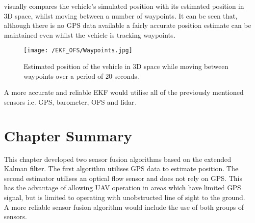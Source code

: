  visually compares the vehicle's simulated position with its estimated position in 3D space, whilst moving between a number of waypoints. It can be seen that, although there is no GPS data available a fairly accurate position estimate can be maintained even whilst the vehicle is tracking waypoints.
\begin{figure}[htb]
\begin{center}
	\texttt{[image: /EKF\_OFS/Waypoints.jpg]}\\
	\end{center}
	\caption{Estimated position of the vehicle in 3D space while moving between waypoints over a period of 20 seconds.}%
	\label{fig:EKF_OFS_3D}%
\end{figure}


A more accurate and reliable EKF would utilise all of the previously mentioned sensors i.e. GPS, barometer, OFS and lidar. 

\FloatBarrier

\section{Chapter Summary}
This chapter developed two sensor fusion algorithms based on the extended Kalman filter. The first algorithm utilises GPS data to estimate position. The second estimator utilises an optical flow sensor and does not rely on GPS. This has the advantage of allowing UAV operation in areas which have limited GPS signal, but is limited to operating with unobstructed line of sight to the ground. A more reliable sensor fusion algorithm would include the use of both groups of sensors.

\clearpage


